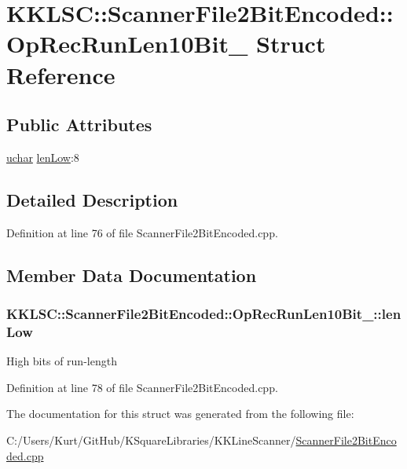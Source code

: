 \hypertarget{struct_scanner_file2_bit_encoded_1_1_op_rec_run_len10_bit__2}{}\section{K\+K\+L\+SC\+:\+:Scanner\+File2\+Bit\+Encoded\+:\+:Op\+Rec\+Run\+Len10\+Bit\+\_ Struct Reference}
\label{struct_scanner_file2_bit_encoded_1_1_op_rec_run_len10_bit__2}
\subsection*{Public Attributes}
\begin{DoxyCompactItemize}
\item 
\hyperlink{namespace_k_k_b_ace9969169bf514f9ee6185186949cdf7}{uchar} \hyperlink{struct_scanner_file2_bit_encoded_1_1_op_rec_run_len10_bit__2_a31ed4c95886991eb160a8f88b6d0cec1}{len\+Low}\+:8
\end{DoxyCompactItemize}


\subsection{Detailed Description}


Definition at line 76 of file Scanner\+File2\+Bit\+Encoded.\+cpp.



\subsection{Member Data Documentation}
\subsubsection[{\texorpdfstring{len\+Low}{lenLow}}]{ K\+K\+L\+S\+C\+::\+Scanner\+File2\+Bit\+Encoded\+::\+Op\+Rec\+Run\+Len10\+Bit\+\_\+::len\+Low}\hypertarget{struct_scanner_file2_bit_encoded_1_1_op_rec_run_len10_bit__2_a31ed4c95886991eb160a8f88b6d0cec1}{}\label{struct_scanner_file2_bit_encoded_1_1_op_rec_run_len10_bit__2_a31ed4c95886991eb160a8f88b6d0cec1}
High bits of run-\/length 

Definition at line 78 of file Scanner\+File2\+Bit\+Encoded.\+cpp.



The documentation for this struct was generated from the following file\+:\begin{DoxyCompactItemize}
\item 
C\+:/\+Users/\+Kurt/\+Git\+Hub/\+K\+Square\+Libraries/\+K\+K\+Line\+Scanner/\hyperlink{_scanner_file2_bit_encoded_8cpp}{Scanner\+File2\+Bit\+Encoded.\+cpp}\end{DoxyCompactItemize}
